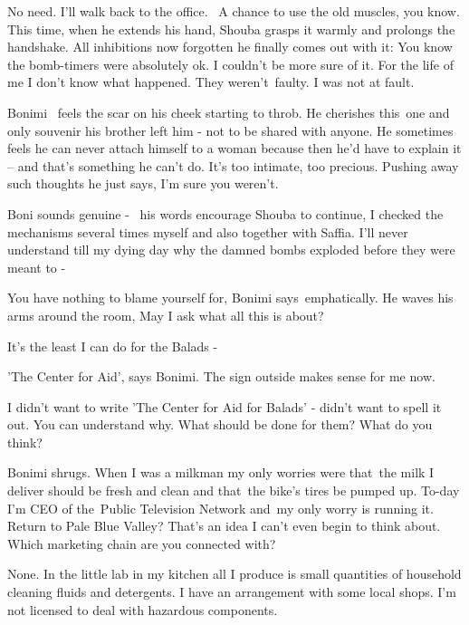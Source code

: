 \documentclass[12pt]{book}
\begin{document}
{\textquotedbl}No need. I'll walk back to the office. \ A chance to use the old muscles, you know.{\textquotedbl} This
time, when he extends his hand, Shouba grasps it warmly and prolongs the handshake. All inhibitions now forgotten he
finally comes out with it: {\textquotedbl}You know the bomb-timers were absolutely ok. I couldn't be more sure of it.
For the life of me I don't know what happened. They weren't~faulty. I was not at fault.{\textquotedbl}

Bonimi~ feels the scar on his cheek starting to throb. He cherishes this~one and only souvenir his brother left him -
not to be shared with anyone. He sometimes feels he can never attach himself to a woman because then he'd have to
explain it -- and that's something he can't do. It's too intimate, too precious. Pushing away such thoughts he just
says, {\textquotedbl}I'm sure you weren't.{\textquotedbl}

Boni sounds genuine - \ his words encourage Shouba to continue, {\textquotedbl}I checked the mechanisms several times
myself and also together with Saffia. I'll never understand till my dying day{
}why the damned{ }bombs exploded before they were meant to -{\textquotedbl}

{\textquotedbl}You have nothing to blame yourself for,{\textquotedbl} Bonimi says~emphatically. He waves his arms around
the room, {\textquotedbl}May I ask what all this is about?{\textquotedbl}

{\textquotedbl}It's the least I can do for the Balads -{\textquotedbl}

{\textquotedbl}'The Center for Aid',{\textquotedbl} says Bonimi. {\textquotedbl}The sign outside makes sense for me
now.{\textquotedbl}

{\textquotedbl}I didn't want to write 'The Center for Aid for Balads' - didn't want to spell it out. You can understand
why. What should be done for them? What do you think?{\textquotedbl}

Bonimi shrugs. {\textquotedbl}When I was a milkman my only worries were that~the milk I deliver should be fresh and
clean and that~the bike's tires be pumped up. To-day I'm CEO of the~Public Television Network and~my only worry is
running it.~ Return to Pale Blue Valley? That's an idea I can't even begin to think about. Which marketing chain are
you connected with?{\textquotedbl}

{\textquotedbl}None. In the little lab in my kitchen all I produce is small quantities of household cleaning fluids and
detergents. I have an arrangement with some local shops. I'm not licensed to deal with hazardous
components.{\textquotedbl}
\end{document}
